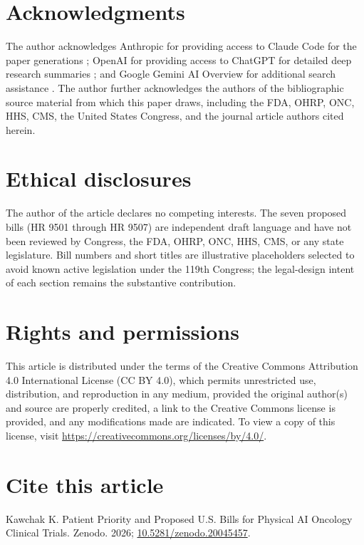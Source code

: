 
{}
\section*{Acknowledgments}
\label{sec:acknowledgments}

The author acknowledges Anthropic for providing access to Claude Code
for the paper generations \cite{claude_code, claude_opus_47,
claude_sonnet_46}; OpenAI for providing access to ChatGPT for detailed
deep research summaries \cite{chatgpt_thinking}; and Google Gemini AI
Overview for additional search assistance
\cite{google_gemini_overview}. The author further acknowledges the
authors of the bibliographic source material from which this paper
draws, including the FDA, OHRP, ONC, HHS, CMS, the United States
Congress, and the journal article authors cited herein.

{}
\section*{Ethical disclosures}
\label{sec:ethics}

The author of the article declares no competing interests. The seven
proposed bills (HR 9501 through HR 9507) are independent draft
language and have not been reviewed by Congress, the FDA, OHRP, ONC,
HHS, CMS, or any state legislature. Bill numbers and short titles are
illustrative placeholders selected to avoid known active legislation
under the 119th Congress; the legal-design intent of each section
remains the substantive contribution.

{}
\section*{Rights and permissions}
\label{sec:rights}

This article is distributed under the terms of the Creative Commons
Attribution 4.0 International License (CC BY 4.0), which permits
unrestricted use, distribution, and reproduction in any medium,
provided the original author(s) and source are properly credited, a
link to the Creative Commons license is provided, and any modifications
made are indicated. To view a copy of this license, visit
\url{https://creativecommons.org/licenses/by/4.0/}.

{}
\section*{Cite this article}
\label{sec:cite}

Kawchak K. Patient Priority and Proposed U.S. Bills for Physical AI
Oncology Clinical Trials. Zenodo. 2026;
\href{https://doi.org/10.5281/zenodo.20045457}{10.5281/zenodo.20045457}.
